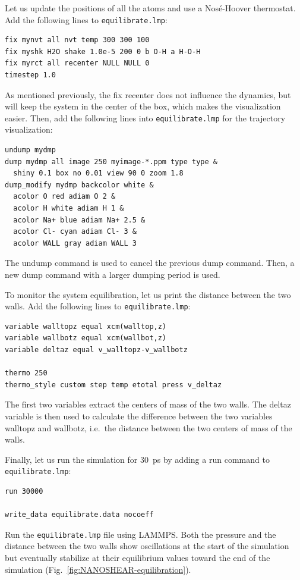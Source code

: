 \documentclass[9pt,tutorial]{livecoms}
\newcommand{\lmpcmd}[1]{\hspace{0pt}\colorbox{listing}{\textcolor{command}{\small{#1}}}\hspace{0pt}} %
\newcommand{\flecmd}[1]{\textcolor{command}{\texttt{#1}}} %
\begin{document}
Let us update the positions of all the atoms and use a Nosé-Hoover
thermostat.  Add the following lines to \flecmd{equilibrate.lmp}:
\begin{lstlisting}
fix mynvt all nvt temp 300 300 100
fix myshk H2O shake 1.0e-5 200 0 b O-H a H-O-H
fix myrct all recenter NULL NULL 0
timestep 1.0
\end{lstlisting}
As mentioned previously, the \lmpcmd{fix recenter} does not influence the dynamics,
but will keep the system in the center of the box, which makes the
visualization easier.  Then, add the following lines into \flecmd{equilibrate.lmp}
for the trajectory visualization:
\begin{lstlisting}
undump mydmp
dump mydmp all image 250 myimage-*.ppm type type &
  shiny 0.1 box no 0.01 view 90 0 zoom 1.8
dump_modify mydmp backcolor white &
  acolor O red adiam O 2 &
  acolor H white adiam H 1 &
  acolor Na+ blue adiam Na+ 2.5 &
  acolor Cl- cyan adiam Cl- 3 &
  acolor WALL gray adiam WALL 3
\end{lstlisting}
The \lmpcmd{undump} command is used to cancel the previous \lmpcmd{dump} command.
Then, a new \lmpcmd{dump} command with a larger dumping period is used.

To monitor the system equilibration, let us print the distance between
the two walls.  Add the following lines to \flecmd{equilibrate.lmp}:
\begin{lstlisting}
variable walltopz equal xcm(walltop,z)
variable wallbotz equal xcm(wallbot,z)
variable deltaz equal v_walltopz-v_wallbotz

thermo 250
thermo_style custom step temp etotal press v_deltaz
\end{lstlisting}
The first two variables extract the centers of mass of the two walls.  The
\lmpcmd{deltaz} variable is then used to calculate the difference between the two
variables \lmpcmd{walltopz} and \lmpcmd{wallbotz}, i.e.~the distance between the
two centers of mass of the walls.

Finally, let us run the simulation for 30~ps by adding a \lmpcmd{run} command
to \flecmd{equilibrate.lmp}:
\begin{lstlisting}
run 30000

write_data equilibrate.data nocoeff
\end{lstlisting}
Run the \flecmd{equilibrate.lmp} file using LAMMPS.  Both the pressure and the distance
between the two walls show oscillations at the start of the simulation
but eventually stabilize at their equilibrium values toward
the end of the simulation (Fig.~\ref{fig:NANOSHEAR-equilibration}).
\end{document}
